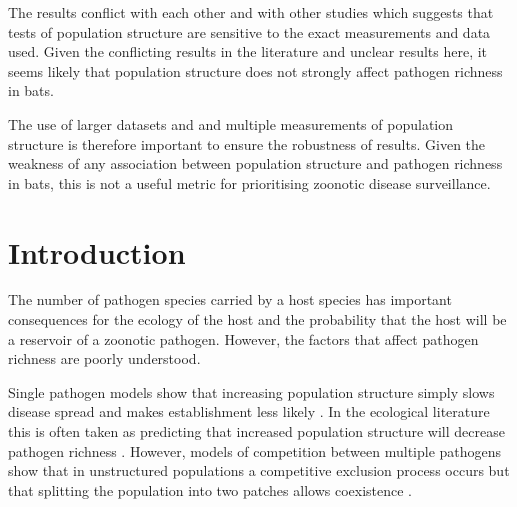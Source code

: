 The results conflict with each other and with other studies which suggests that tests of population structure are sensitive to the exact measurements and data used.
Given the conflicting results in the literature and unclear results here, it seems likely that population structure does not strongly affect pathogen richness in bats.


The use of larger datasets and and multiple measurements of population structure is therefore important to ensure the robustness of results.
Given the weakness of any association between population structure and pathogen richness in bats, this is not a useful metric for prioritising zoonotic disease surveillance.








\section{Introduction}


The number of pathogen species carried by a host species has important consequences for the ecology of the host and the probability that the host will be a reservoir of a zoonotic pathogen.
However, the factors that affect pathogen richness are poorly understood.







Single pathogen models show that increasing population structure simply slows disease spread and makes establishment less likely \cite{colizza2007invasion, vespignani2008reaction}.
In the ecological literature this is often taken as predicting that increased population structure will decrease pathogen richness \cite{nunn2003comparative, morand2000wormy}.
However, models of competition between multiple pathogens show that in unstructured populations a competitive exclusion process occurs but that splitting the population into two patches allows coexistence \cite{qiu2013vector,allen2004sis, nunes2006localized}.


